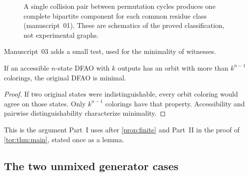 \documentclass[11pt,a4paper]{article}
\numberwithin{equation}{section}
\theoremstyle{definition}
\theoremstyle{remark}
\begin{document}
\begin{figure}[htbp]
\centering
{}
\caption{A single collision pair between permutation cycles produces one
complete bipartite component for each common residue class (manuscript~01).
These are schematics of the proved classification, not experimental graphs.}
\label{evo:et:fig:graphs}
\end{figure}

Manuscript~03 adds a small test, used for the minimality of witnesses.

\begin{lemma}\label{evo:da:lem:minimal}
If an accessible $n$-state DFAO with $k$ outputs has an orbit with more than
$k^{n-1}$ colorings, the original DFAO is minimal.
\end{lemma}
\begin{proof}
If two original states were indistinguishable, every orbit coloring would
agree on those states. Only $k^{n-1}$ colorings have that property.
Accessibility and pairwise distinguishability characterize minimality.
\end{proof}

This is the argument Part~I uses after \cref{prop:finite} and Part~II in the
proof of \cref{tor:thm:main}, stated once as a lemma.

\subsection{The two unmixed generator cases}\label{evo:sec:unmixed}
\end{document}
